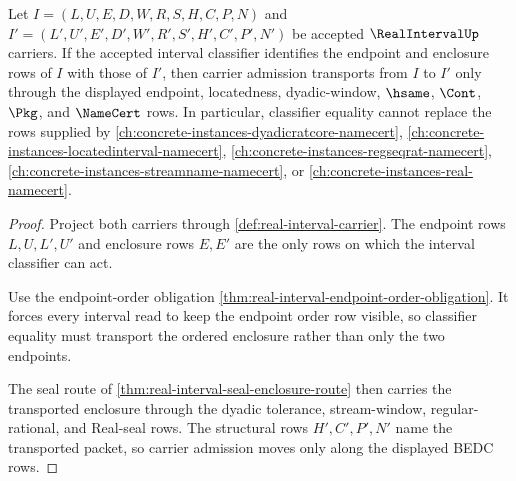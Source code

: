 \begin{theorem}
\label{thm:real-interval-classifier-transport}
Let $I=(L,U,E,D,W,R,S,H,C,P,N)$ and $I'=(L',U',E',D',W',R',S',H',C',P',N')$ be accepted $\RealIntervalUp$ carriers. If the accepted interval classifier identifies the endpoint and enclosure rows of $I$ with those of $I'$, then carrier admission transports from $I$ to $I'$ only through the displayed endpoint, locatedness, dyadic-window, $\hsame$, $\Cont$, $\Pkg$, and $\NameCert$ rows. In particular, classifier equality cannot replace the rows supplied by \autoref{ch:concrete-instances-dyadicratcore-namecert}, \autoref{ch:concrete-instances-locatedinterval-namecert}, \autoref{ch:concrete-instances-regseqrat-namecert}, \autoref{ch:concrete-instances-streamname-namecert}, or \autoref{ch:concrete-instances-real-namecert}.
\end{theorem}
\begin{proof}
Project both carriers through \autoref{def:real-interval-carrier}. The endpoint rows $L,U,L',U'$ and enclosure rows $E,E'$ are the only rows on which the interval classifier can act.

Use the endpoint-order obligation \autoref{thm:real-interval-endpoint-order-obligation}. It forces every interval read to keep the endpoint order row visible, so classifier equality must transport the ordered enclosure rather than only the two endpoints.

The seal route of \autoref{thm:real-interval-seal-enclosure-route} then carries the transported enclosure through the dyadic tolerance, stream-window, regular-rational, and Real-seal rows. The structural rows $H',C',P',N'$ name the transported packet, so carrier admission moves only along the displayed BEDC rows.
\end{proof}

